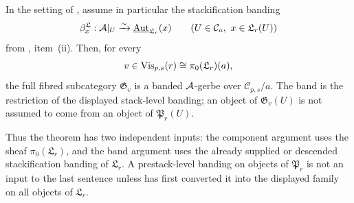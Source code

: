 \begin{theorem}\label{thm:component-gerbe-decomposition}
In the setting of , assume in particular
the stackification banding
\[
\beta^{\mathfrak L}_x:\mathcal{A}|_U\xrightarrow{\sim}
\underline{\mathrm{Aut}}_{\mathfrak L_r}(x)
\qquad (U\in\mathcal C_a,\ x\in\mathfrak L_r(U))
\]
from , item~\textup{(ii)}. Then, for every
\[
v\in \mathrm{Vis}_{p,s}(r)\cong \pi_0(\mathfrak L_r)(a),
\]
the full fibred subcategory $\mathfrak G_v$ is a banded $\mathcal{A}$-gerbe over
$\mathcal C_{p,s}/a$. The band is the restriction of the displayed stack-level
banding; an object of $\mathfrak G_v(U)$ is not assumed to come from an object of
$\mathfrak P_r(U)$.

Thus the theorem has two independent inputs: the component argument uses the
sheaf $\pi_0(\mathfrak L_r)$, and the band argument uses the already supplied
or descended stackification banding of $\mathfrak L_r$. A prestack-level
banding on objects of $\mathfrak P_r$ is not an input to the last sentence
unless  has first converted it into the
displayed family on all objects of $\mathfrak L_r$.
\end{theorem}

